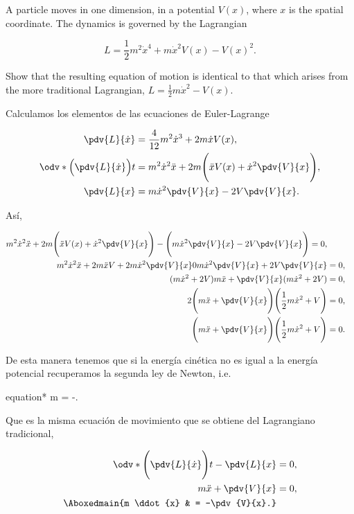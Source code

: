 \documentclass[../main.tex]{subfiles}
\begin{document}
\begin{problema}
	A particle moves in one dimension, in a potential \(V(x)\), where \(x\)
	is the spatial coordinate. The dynamics is governed by the Lagrangian

	\begin{equation*}
		L = \dfrac{1}{2}m^{2}\dot{x}^{4} + m \dot{x}^{2}V(x) - V(x)^{2}.
	\end{equation*}

	Show that the resulting equation of motion is identical to that which
	arises from the more traditional Lagrangian, \(L = \tfrac{1}{2}m \dot{x}^{2} - V(x)\).

	\startsolution

	Calculamos los elementos de las ecuaciones de Euler-Lagrange

	\begin{align*}
		\pdv{L}{\dot{x}}                       & = \dfrac{4}{12}m^{2}\dot{x}^{3} + 2m \dot{x}V(x),                                   \\
		\odv*{\Bigl(\pdv{L}{\dot{x}}\Bigr)}{t} & = m^{2}\dot{x}^{2}\ddot{x} + 2m \Biggl(\ddot{x}V(x) + \dot{x}^{2}\pdv{V}{x}\Biggr), \\
		\pdv{L}{x}                             & = m \dot{x}^{2}\pdv{V}{x} - 2V \pdv{V}{x}.
	\end{align*}

	Así,

	\begin{align*}
		m^{2} \dot{x}^{2}\ddot{x} + 2m \Biggl(\ddot{x}V(x) + \dot{x}^{2}\pdv{V}{x}\Biggr) -
		\Biggl(m \dot{x}^{2}\pdv{V}{x} - 2V \pdv{V}{x}\Biggr) = 0,                               \\
		m^{2}\dot{x}^{2}\ddot{x} + 2m \ddot{x}V + 2m \dot{x}^{2}\pdv{V}{x} 0 m \dot{x}^{2}\pdv{V}{x}
		+ 2V \pdv{V}{x}                                                                   & = 0, \\
		(m \dot{x}^{2} + 2V)m \ddot{x} + \pdv{V}{x}(m \dot{x}^{2} + 2V)                   & = 0, \\
		2\Biggl(m \ddot{x} + \pdv{V}{x}\Biggr)\Biggl(\dfrac{1}{2}m \dot{x}^{2} + V\Biggr) & = 0, \\
		\Biggl(m \ddot{x} + \pdv{V}{x}\Biggr)\Biggl(\dfrac{1}{2}m \dot{x}^{2} + V\Biggr)  & = 0.
	\end{align*}

	De esta manera tenemos que si la energía cinética no es igual a la energía
	potencial recuperamos la segunda ley de Newton, i.e.

	\begin{empheq}[box = \mainresult]{equation*}
		m  = -.
	\end{empheq}

	Que es la misma ecuación de movimiento que se obtiene del Lagrangiano
	tradicional,

	\begin{align*}
		\odv*{\Biggl(\pdv{L}{\dot{x}}\Biggr)}{t} - \pdv{L}{x} & = 0,            \\
		m \ddot{x} + \pdv{V}{x}                               & = 0,            \\
		\Aboxedmain{m \ddot{x}                                & = -\pdv{V}{x}.}
	\end{align*}
\end{problema}
\end{document}
